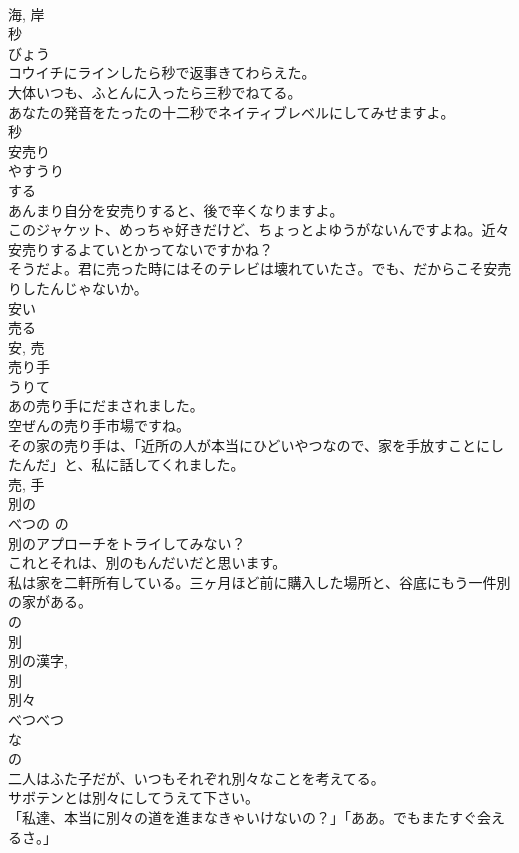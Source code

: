 \documentclass[8pt]{extreport}
\begin{document}
\begin{CJK}{UTF8}{min}
\\	海, 岸	
\\	秒	
\\	びょう	
\\	コウイチにラインしたら秒で返事きてわらえた。	
\\	大体いつも、ふとんに入ったら三秒でねてる。	
\\	あなたの発音をたったの十二秒でネイティブレベルにしてみせますよ。	
\\	秒	
\\	安売り	
\\	やすうり	
\\	する 
\\	あんまり自分を安売りすると、後で辛くなりますよ。	
\\	このジャケット、めっちゃ好きだけど、ちょっとよゆうがないんですよね。近々安売りするよていとかってないですかね？	
\\	そうだよ。君に売った時にはそのテレビは壊れていたさ。でも、だからこそ安売りしたんじゃないか。	
\\	安い 
\\	売る 
\\	安, 売	
\\	売り手	
\\	うりて	
\\	あの売り手にだまされました。	
\\	空ぜんの売り手市場ですね。	
\\	その家の売り手は、「近所の人が本当にひどいやつなので、家を手放すことにしたんだ」と、私に話してくれました。	
\\	売, 手	
\\	別の	
\\	べつの	の 
\\	別のアプローチをトライしてみない？	
\\	これとそれは、別のもんだいだと思います。	
\\	私は家を二軒所有している。三ヶ月ほど前に購入した場所と、谷底にもう一件別の家がある。	
\\	の 
\\	別 
\\	別の漢字, 
\\	別	
\\	別々	
\\	べつべつ	
\\	な 
\\	の 
\\	二人はふた子だが、いつもそれぞれ別々なことを考えてる。	
\\	サボテンとは別々にしてうえて下さい。	
\\	「私達、本当に別々の道を進まなきゃいけないの？」「ああ。でもまたすぐ会えるさ。」	

\end{CJK}
\end{document}
